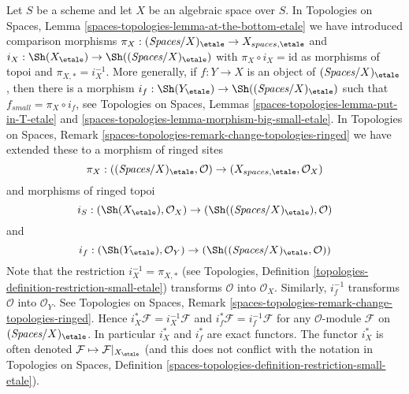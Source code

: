 \noindent
Let $S$ be a scheme and let $X$ be an algebraic space over $S$.
In Topologies on Spaces, Lemma
\ref{spaces-topologies-lemma-at-the-bottom-etale}
we have introduced comparison morphisms
$\pi_X : (\textit{Spaces}/X)_\etale \to X_{spaces, \etale}$ and
$i_X : \Sh(X_\etale) \to \Sh((\textit{Spaces}/X)_\etale)$
with $\pi_X \circ i_X = \text{id}$ as morphisms of topoi and
$\pi_{X, *} = i_X^{-1}$.
More generally, if $f : Y \to X$ is an object of $(\textit{Spaces}/X)_\etale$,
then there is a morphism
$i_f : \Sh(Y_\etale) \to \Sh((\textit{Spaces}/X)_\etale)$
such that $f_{small} = \pi_X \circ i_f$, see
Topologies on Spaces, Lemmas \ref{spaces-topologies-lemma-put-in-T-etale} and
\ref{spaces-topologies-lemma-morphism-big-small-etale}. In
Topologies on Spaces, Remark
\ref{spaces-topologies-remark-change-topologies-ringed}
we have extended these to a morphism of ringed sites
$$
\pi_X :
((\textit{Spaces}/X)_\etale, \mathcal{O})
\to
(X_{spaces, \etale}, \mathcal{O}_X)
$$
and morphisms of ringed topoi
$$
i_S :
(\Sh(X_\etale), \mathcal{O}_X)
\to
(\Sh((\textit{Spaces}/X)_\etale), \mathcal{O})
$$
and
$$
i_f :
(\Sh(Y_\etale), \mathcal{O}_Y)
\to
(\Sh((\textit{Spaces}/X)_\etale, \mathcal{O}))
$$
Note that the restriction $i_X^{-1} = \pi_{X, *}$ (see
Topologies, Definition \ref{topologies-definition-restriction-small-etale})
transforms $\mathcal{O}$ into $\mathcal{O}_X$.
Similarly, $i_f^{-1}$ transforms $\mathcal{O}$ into $\mathcal{O}_Y$.
See Topologies on Spaces, Remark
\ref{spaces-topologies-remark-change-topologies-ringed}.
Hence $i_X^*\mathcal{F} = i_X^{-1}\mathcal{F}$ and
$i_f^*\mathcal{F} = i_f^{-1}\mathcal{F}$ for any $\mathcal{O}$-module
$\mathcal{F}$ on $(\textit{Spaces}/X)_\etale$. In particular $i_X^*$ and $i_f^*$
are exact functors. The functor $i_X^*$ is often denoted
$\mathcal{F} \mapsto \mathcal{F}|_{X_\etale}$ (and this does not
conflict with the notation in
Topologies on Spaces, Definition
\ref{spaces-topologies-definition-restriction-small-etale}).

